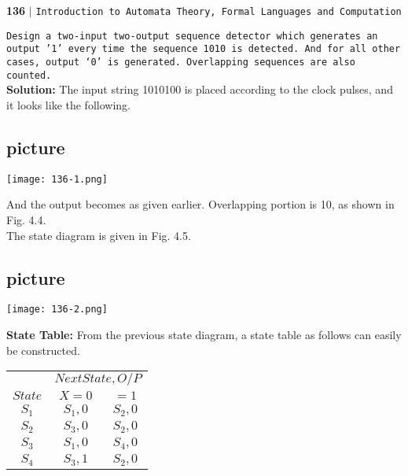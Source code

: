 \documentclass{article}
\begin{document}
\newpage
\begin{flushleft}
    \textbf{136}\hspace*{0.1cm} \textbf{$|$} \hspace*{0.1cm} \texttt{Introduction to Automata Theory, Formal Languages and Computation}
  \end{flushleft}

  \vspace*{0.5cm}
\hspace*{0.1cm} \texttt{Design a two-input two-output sequence detector which generates an output '1' every
time the sequence 1010 is detected. And for all other cases, output ‘0’ is generated.
Overlapping sequences are also counted.}\\

\vspace*{0.5cm}
\textbf{Solution:} The input string 1010100 is placed according to the clock pulses, and it looks like the
following.\\

  \begin{center}
\section{picture}
\texttt{[image: 136-1.png]}
\end{center}

And the output becomes as given earlier. Overlapping portion is 10, as shown in Fig. 4.4.\\
The state diagram is given in Fig. 4.5.\\

  \begin{center}
\section{picture}
\texttt{[image: 136-2.png]}
\end{center}

\textbf{State Table:} From the previous state diagram, a state table as follows can easily be constructed.\\

\begin{center}
\begin{tabular}{ccc}
 \hline

 \hline

 \hline

 \hline
 & \multicolumn{2}{c}{$Next State, O/P$}\\
 \cline{2-3}
 $State$ &  $X=0$ & $=1$\\
\hline
$S_1$ & $S_1, 0$  & $S_2, 0$\\
$S_2$ & $S_3, 0$  & $S_2, 0$\\
$S_3$ & $S_1, 0$  & $S_4, 0$\\
$S_4$ & $S_3, 1$  & $S_2, 0$\\
 \hline

 \hline

 \hline

 \hline
\end{tabular}
\end{center}
\end{document}
